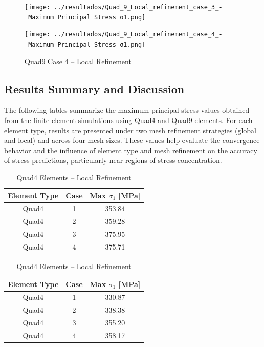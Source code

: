 \documentclass[12pt]{article}
\begin{document}
\begin{figure}[H]
    \centering
    \begin{minipage}{0.48\textwidth}
        \centering
        \texttt{[image: ../resultados/Quad\_9\_Local\_refinement\_case\_3\_-\_Maximum\_Principal\_Stress\_σ1.png]}
        \caption{Quad9 Case 3 – Local Refinement}
        \label{fig:quad9_results_local3}
    \end{minipage}
    \hfill
    \begin{minipage}{0.48\textwidth}
        \centering
        \texttt{[image: ../resultados/Quad\_9\_Local\_refinement\_case\_4\_-\_Maximum\_Principal\_Stress\_σ1.png]}
        \caption{Quad9 Case 4 – Local Refinement}
        \label{fig:quad9_results_local4}
    \end{minipage}
\end{figure}

\newpage
\subsection{Results Summary and Discussion }

The following tables summarize the maximum principal stress values obtained from the finite element simulations using Quad4 and Quad9 elements. For each element type, results are presented under two mesh refinement strategies (global and local) and across four mesh sizes. These values help evaluate the convergence behavior and the influence of element type and mesh refinement on the accuracy of stress predictions, particularly near regions of stress concentration.

\begin{table}[H]
\centering
\begin{minipage}{0.48\textwidth}
\centering
\begin{tabular}{|c|c|c|}
\hline
\textbf{Element Type} & \textbf{Case} & \textbf{Max $\sigma_1$ [MPa]} \\
\hline
Quad4 & 1 & 353.84 \\
Quad4 & 2 & 359.28 \\
Quad4 & 3 & 375.95 \\
Quad4 & 4 & 375.71 \\
\hline
\end{tabular}
\caption{Quad4 Elements – Global Refinement}
\label{tab:quad4_global}
\end{minipage}
\hfill
\begin{minipage}{0.48\textwidth}
\centering
\begin{tabular}{|c|c|c|}
\hline
\textbf{Element Type} & \textbf{Case} & \textbf{Max $\sigma_1$ [MPa]} \\
\hline
Quad4 & 1 & 330.87 \\
Quad4 & 2 & 338.38 \\
Quad4 & 3 & 355.20 \\
Quad4 & 4 & 358.17 \\
\hline
\end{tabular}
\caption{Quad4 Elements – Local Refinement}
\label{tab:quad4_local}
\end{minipage}
\end{table}
\end{document}
